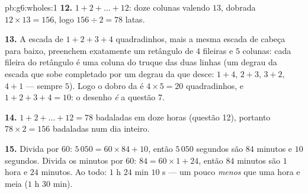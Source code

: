 \begin{solution}{pb:g6:wholes:1}
\textbf{12.} $1 + 2 + \dots + 12$: doze colunas valendo $13$, 
dobrada $12 \times 13 = 156$, logo $156 \div 2 = 78$ latas.

\textbf{13.} A escada de $1 + 2 + 3 + 4$ quadradinhos, mais a mesma
escada de cabeça para baixo, preenchem exatamente um retângulo de $4$
fileiras e $5$ colunas: cada fileira do retângulo é uma coluna do truque
das duas linhas (um degrau da escada que sobe completado por um degrau
da que desce: $1 + 4$, $2 + 3$, $3 + 2$, $4 + 1$ --- sempre $5$). Logo o
dobro da  é $4 \times 5 = 20$ quadradinhos, e
$1 + 2 + 3 + 4 = 10$: o desenho \emph{é} a questão 7.

\textbf{14.} $1 + 2 + \dots + 12 = 78$ badaladas em doze horas (questão
12), portanto $78 \times 2 = 156$ badaladas num dia inteiro.

\textbf{15.} Divida por $60$: $5\,050 = 60 \times 84 + 10$, então
$5\,050$ segundos são $84$ minutos e $10$ segundos. Divida os minutos
por $60$: $84 = 60 \times 1 + 24$, então $84$ minutos são $1$ hora e
$24$ minutos. Ao todo: $1$ h $24$ min $10$ s --- um pouco \emph{menos}
que uma hora e meia ($1$ h $30$ min).
\end{solution}
